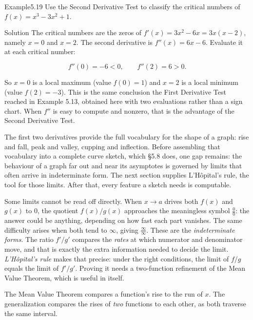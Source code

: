 \documentclass[a4paper,12pt,oneside]{memoir}
\begin{document}
\begin{workedexample}
\begin{envexample}{Example}{5.19}{}
Use the Second Derivative Test to classify the critical numbers of \(f(x) = x^{3} - 3x^{2} + 1\).
\end{envexample}
\begin{envsolution}{Solution}{}{}
The critical numbers are the zeros of \(f'(x) = 3x^{2} - 6x = 3x(x - 2)\), namely \(x = 0\) and \(x = 2\). The second derivative is \(f''(x) = 6x - 6\). Evaluate it at each critical number:

\[ f''(0) = -6 < 0, \qquad f''(2) = 6 > 0. \]

So \(x = 0\) is a local maximum (value \(f(0) = 1\)) and \(x = 2\) is a local minimum (value \(f(2) = -3\)). This is the same conclusion the First Derivative Test reached in Example 5.13, obtained here with two evaluations rather than a sign chart. When \(f''\) is easy to compute and nonzero, that is the advantage of the Second Derivative Test. \qedmark
\end{envsolution}
\end{workedexample}
The first two derivatives provide the full vocabulary for the shape of a graph: rise and fall, peak and valley, cupping and inflection. Before assembling that vocabulary into a complete curve sketch, which §5.8 does, one gap remains: the behaviour of a graph far out and near its asymptotes is governed by limits that often arrive in indeterminate form. The next section supplies L’Hôpital’s rule, the tool for those limits. After that, every feature a sketch needs is computable.


Some limits cannot be read off directly. When \(x \to a\) drives both \(f(x)\) and \(g(x)\) to \(0\), the quotient \(f(x)/g(x)\) approaches the meaningless symbol \(\tfrac{0}{0}\): the answer could be anything, depending on how fast each part vanishes. The same difficulty arises when both tend to \(\infty\), giving \(\tfrac{\infty}{\infty}\). These are the \emph{indeterminate forms}. The ratio \(f'\!/g'\) compares the \emph{rates} at which numerator and denominator move, and that is exactly the extra information needed to decide the limit. \emph{L’Hôpital’s rule} makes that precise: under the right conditions, the limit of \(f/g\) equals the limit of \(f'\!/g'\). Proving it needs a two-function refinement of the Mean Value Theorem, which is useful in itself.

The Mean Value Theorem compares a function’s rise to the run of \(x\). The generalization compares the rises of \emph{two} functions to each other, as both traverse the same interval.
\end{document}
